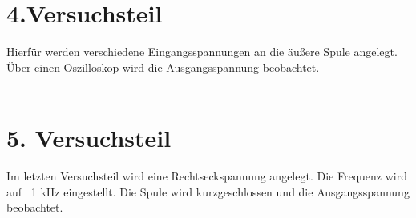         \section{4.Versuchsteil}
        Hierfür werden verschiedene Eingangsspannungen an die äußere Spule angelegt. Über einen Oszilloskop wird die Ausgangsspannung beobachtet.\\
        \\
        \section{5. Versuchsteil}
        Im letzten Versuchsteil wird eine Rechtseckspannung angelegt. Die Frequenz wird auf \   1 kHz eingestellt. Die Spule wird kurzgeschlossen und die Ausgangsspannung beobachtet.
        
\pagebreak
